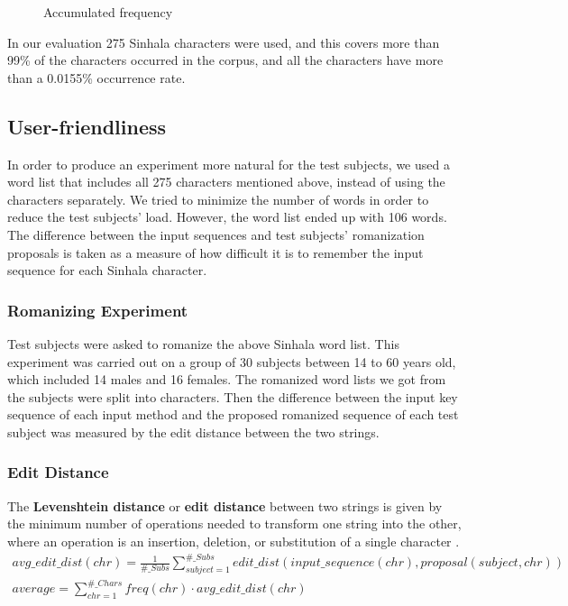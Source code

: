 \documentclass[english]{jnlp_1.3e}
\begin{document}
\begin{figure}[t]

\caption{Accumulated frequency}
\end{figure}


In our evaluation 275 Sinhala characters were used, and this covers more than 99\% of the characters occurred in the corpus, and all the characters have more than  a  0.0155\% occurrence rate. 




\subsection{User-friendliness}

In order to produce an experiment more natural for the test subjects, we used a word list  that  includes  all 275  characters mentioned above, instead of using the characters separately. 
We tried to minimize the number of words in order to reduce the test subjects' load. However,  the word list ended up with 106 words. 
The difference between the input sequences and test subjects' romanization proposals is taken as a measure of how difficult it is to remember the input sequence for each Sinhala character.

    \subsubsection*{Romanizing Experiment} 
Test subjects  were  asked to romanize the above Sinhala word list.  
This experiment was carried out on a group of 30 subjects between 14 to 60 years old, which  included  14 males and 16 females. 
The romanized word  lists we  got from the subjects  were  split into characters. 
Then the difference between the input key sequence of each input method  and the  proposed romanized sequence of each test subject  was  measured by the edit distance between the two strings.

    \subsubsection*{Edit Distance}
The \textbf{Levenshtein distance} or \textbf{edit distance} between two strings is given by the minimum number of operations needed to transform one string into the other, 
where an operation is an insertion, deletion, or substitution of a single character \cite{edit_distance}.
\begin{gather}
 \mathit{avg\_edit\_dist}(\mathit{chr})=\frac{1}{\#\_\mathit{Subs}}\sum _{\mathit{subject}= 1} ^{\#\_\mathit{Subs}} \mathit{edit\_dist}(\mathit{input\_sequence}(\mathit{chr}), \mathit{proposal}(\mathit{subject,chr})) \label{eqn:edit_dist_1} \\ 
 \mathit{average}=\sum _{\mathit{chr}= 1} ^{\#\_\mathit{Chars}} \mathit{freq}(\mathit{chr})\cdot \mathit{avg\_edit\_dist}(\mathit{chr}) \label{eqn:edit_dist_2}
\end{gather}
\end{document}
